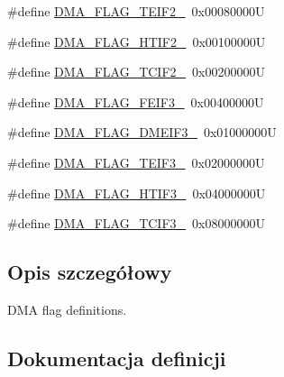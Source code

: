 \begin{DoxyCompactItemize}
\item 
\#define \hyperlink{group___d_m_a__flag__definitions_ga7801bd49cbbe19be612718965e8c675e}{D\+M\+A\+\_\+\+F\+L\+A\+G\+\_\+\+T\+E\+I\+F2\+\_}~0x00080000U
\item 
\#define \hyperlink{group___d_m_a__flag__definitions_ga2ae0054d63c453a14b6d3822c503e7b4}{D\+M\+A\+\_\+\+F\+L\+A\+G\+\_\+\+H\+T\+I\+F2\+\_}~0x00100000U
\item 
\#define \hyperlink{group___d_m_a__flag__definitions_gab8096a50b81e30e474e2b1148b55a983}{D\+M\+A\+\_\+\+F\+L\+A\+G\+\_\+\+T\+C\+I\+F2\+\_}~0x00200000U
\item 
\#define \hyperlink{group___d_m_a__flag__definitions_gaea8077c9d9c55c53024c9f90e7f2c76f}{D\+M\+A\+\_\+\+F\+L\+A\+G\+\_\+\+F\+E\+I\+F3\+\_}~0x00400000U
\item 
\#define \hyperlink{group___d_m_a__flag__definitions_ga3053e2fb5ef245cf9c847c4de3fd1732}{D\+M\+A\+\_\+\+F\+L\+A\+G\+\_\+\+D\+M\+E\+I\+F3\+\_}~0x01000000U
\item 
\#define \hyperlink{group___d_m_a__flag__definitions_ga7070307dcd59da45137962c521a06562}{D\+M\+A\+\_\+\+F\+L\+A\+G\+\_\+\+T\+E\+I\+F3\+\_}~0x02000000U
\item 
\#define \hyperlink{group___d_m_a__flag__definitions_ga139d44f447ab2cf5c18311cf6b6ee6e2}{D\+M\+A\+\_\+\+F\+L\+A\+G\+\_\+\+H\+T\+I\+F3\+\_}~0x04000000U
\item 
\#define \hyperlink{group___d_m_a__flag__definitions_ga4acf62e6807442dd5b611d95d1617b98}{D\+M\+A\+\_\+\+F\+L\+A\+G\+\_\+\+T\+C\+I\+F3\+\_}~0x08000000U
\end{DoxyCompactItemize}


\subsection{Opis szczegółowy}
D\+MA flag definitions. 



\subsection{Dokumentacja definicji}
\mbox{\label{group___d_m_a__flag__definitions_gaee0e6da831d62bc84e9e28e59b8e9ede}} 
